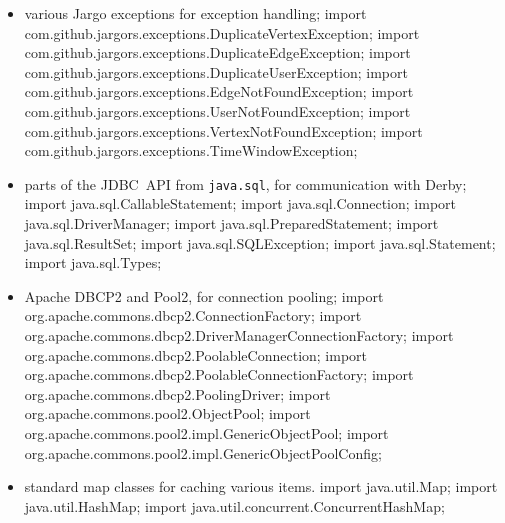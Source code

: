 \begin{itemize}
\item various Jargo exceptions for exception handling;
\nwenddocs{}\plusendmoddef
import com.github.jargors.exceptions.DuplicateVertexException;
import com.github.jargors.exceptions.DuplicateEdgeException;
import com.github.jargors.exceptions.DuplicateUserException;
import com.github.jargors.exceptions.EdgeNotFoundException;
import com.github.jargors.exceptions.UserNotFoundException;
import com.github.jargors.exceptions.VertexNotFoundException;
import com.github.jargors.exceptions.TimeWindowException;
\nwendcode{}\item parts of the JDBC~API from {\tt{}java.sql}, for communication with Derby;
\nwenddocs{}\plusendmoddef
import java.sql.CallableStatement;   import java.sql.Connection;
import java.sql.DriverManager;       import java.sql.PreparedStatement;
import java.sql.ResultSet;           import java.sql.SQLException;
import java.sql.Statement;           import java.sql.Types;
\nwendcode{}\item Apache DBCP2 and Pool2, for connection pooling;
\nwenddocs{}\plusendmoddef
import org.apache.commons.dbcp2.ConnectionFactory;
import org.apache.commons.dbcp2.DriverManagerConnectionFactory;
import org.apache.commons.dbcp2.PoolableConnection;
import org.apache.commons.dbcp2.PoolableConnectionFactory;
import org.apache.commons.dbcp2.PoolingDriver;
import org.apache.commons.pool2.ObjectPool;
import org.apache.commons.pool2.impl.GenericObjectPool;
import org.apache.commons.pool2.impl.GenericObjectPoolConfig;
\nwendcode{}\item standard map classes for caching various items.
\nwenddocs{}\plusendmoddef
import java.util.Map;
import java.util.HashMap;
import java.util.concurrent.ConcurrentHashMap;
\nwendcode{}\nwdocspar
\end{itemize}

